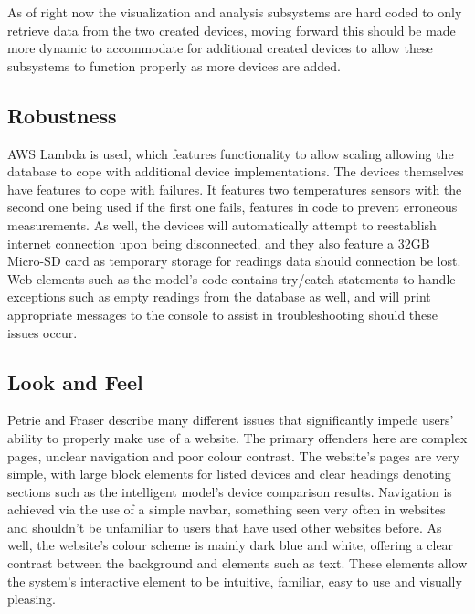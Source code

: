 \documentclass[]{report}
\begin{document}
	As of right now the visualization and analysis subsystems are hard coded to only retrieve data from the two created devices, moving forward this should be made more dynamic to accommodate for additional created devices to allow these subsystems to function properly as more devices are added.
	
	\subsection{Robustness}
	AWS Lambda is used, which features functionality to allow scaling\cite{awslambdadocs} allowing the database to cope with additional device implementations. The devices themselves have features to cope with failures. It features two temperatures sensors with the second one being used if the first one fails, features in code to prevent erroneous measurements. As well, the devices will automatically attempt to reestablish internet connection upon being disconnected, and they also feature a 32GB Micro-SD card as temporary storage for readings data should connection be lost. Web elements such as the model's code contains try/catch statements to handle exceptions such as empty readings from the database as well, and will print appropriate messages to the console to assist in troubleshooting should these issues occur.
	
	\subsection{Look and Feel}
	Petrie and Fraser\cite{petrie2004tension} describe many different issues that significantly impede users' ability to properly make use of a website. The primary offenders here are complex pages, unclear navigation and poor colour contrast. The website's pages are very simple, with large block elements for listed devices and clear headings denoting sections such as the intelligent model's device comparison results. Navigation is achieved via the use of a simple navbar, something seen very often in websites and shouldn't be unfamiliar to users that have used other websites before. As well, the website's colour scheme is mainly dark blue and white, offering a clear contrast between the background and elements such as text. These elements allow the system's interactive element to be intuitive, familiar, easy to use and visually pleasing.
	
\end{document}
